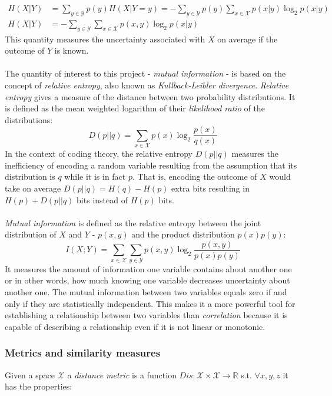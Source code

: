 \documentclass[12pt]{extarticle}
\begin{document}
\begin{equation}
\begin{aligned}
H(X|Y) &= \sum_{y\in\mathcal{Y}} p(y)H(X|Y=y)= -\sum_{y\in\mathcal{Y}}p(y)\sum_{x\in\mathcal{X}}p(x|y)\log_2 p(x|y)\\
H(X|Y) &=-\sum_{y\in\mathcal{Y}}\sum_{x\in\mathcal{X}}p(x,y)\log_2 p(x|y)
\end{aligned}
\end{equation}
This quantity measures the uncertainty associated with $X$ on average if the outcome of $Y$ is known.\\ \\
The quantity of interest to this project - \textit{mutual information} - is based on the concept of \textit{relative entropy}, also known as \textit{Kullback-Leibler divergence}. \textit{Relative entropy} gives a measure of the distance between two probability distributions. It is defined as the mean weighted logarithm of their \textit{likelihood ratio} of the distributions:\\
$$D(p||q)=\sum_{x\in\mathcal{X}}p(x)\log_2 \frac{p(x)}{q(x)}$$
In the context of coding theory, the relative entropy $D(p||q)$ measures the inefficiency of encoding a random variable resulting from the assumption that its distribution is $q$ while it is in fact $p$. That is, encoding the outcome of $X$ would take on average $D(p||q)=H(q)-H(p)$ extra bits resulting in $H(p)+D(p||q)$ bits instead of $H(p)$ bits.\\ \\
\textit{Mutual information} is defined as the relative entropy between the joint distribution of $X$ and $Y$ - $p(x,y)$ and the product distribution $p(x)p(y)$:
$$I(X;Y)=\sum_{x\in\mathcal{X}}\sum_{y\in\mathcal{Y}}p(x,y)\log_2\frac{p(x,y)}{p(x)p(y)}$$
It measures the amount of information one variable contains about another one or in other words, how much knowing one variable decreases uncertainty about another one. The mutual information between two variables equals zero if and only if they are statistically independent. This makes it a more powerful tool for establishing a relationship between two variables than \textit{correlation} because it is capable of describing a relationship even if it is not linear or monotonic.  \\

\subsubsection*{Metrics and similarity measures}
Given a space $\mathcal{X}$ a \textit{distance metric} is a function $Dis:\mathcal{X}\times\mathcal{X}\rightarrow\mathbb{R}$ s.t. $\forall x,y,z$ it has the properties:
\end{document}
